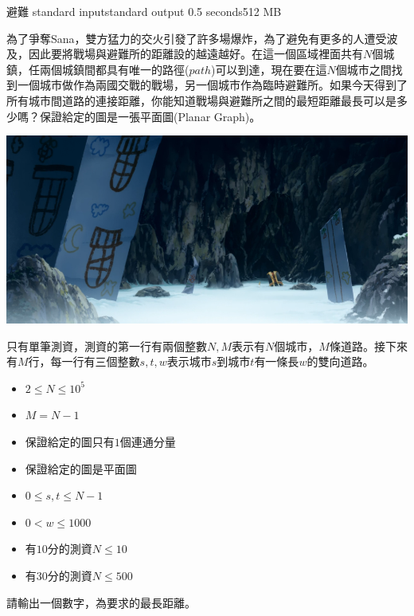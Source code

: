 \gdef\thisproblemauthor{}
\gdef\thisproblemdeveloper{}
\gdef\thisproblemorigin{}
\begin{problem}{避難}
{standard input}{standard output}
{0.5 seconds}{512 MB}{}

為了爭奪Sana，雙方猛力的交火引發了許多場爆炸，為了避免有更多的人遭受波及，因此要將戰場與避難所的距離設的越遠越好。在這一個區域裡面共有$N$個城鎮，任兩個城鎮間都具有唯一的路徑($path$)可以到達，現在要在這$N$個城市之間找到一個城市做作為兩國交戰的戰場，另一個城市作為臨時避難所。如果今天得到了所有城市間道路的連接距離，你能知道戰場與避難所之間的最短距離最長可以是多少嗎？保證給定的圖是一張平面圖(Planar Graph)。

\centerline{\includegraphics[scale=0.5]{./pics/F.png}}

\InputFile

只有單筆測資，測資的第一行有兩個整數$N,M$表示有$N$個城市，$M$條道路。接下來有$M$行，每一行有三個整數$s,t,w$表示城市$s$到城市$t$有一條長$w$的雙向道路。

\begin{iofmt}
\begin{itemize}
	\item $2\leq N \leq 10^5$
	\item $M = N-1$
	\item 保證給定的圖只有$1$個連通分量
	\item 保證給定的圖是平面圖
	\item $0\leq s,t \leq N-1$
	\item $0<w \leq 1000$
	\item 有$10$分的測資$N\leq 10$
	\item 有$30$分的測資$N\leq 500$
\end{itemize}
\end{iofmt}


\OutputFile

請輸出一個數字，為要求的最長距離。

\Examples

\begin{example}
%
\end{example}

\end{problem}
